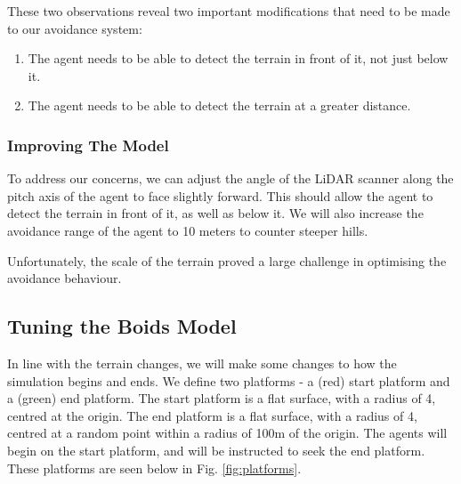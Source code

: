 \documentclass{article}
\begin{document}
These two observations reveal two important modifications that need to be made to our avoidance system:
\begin{enumerate}
    \item The agent needs to be able to detect the terrain in front of it, not just below it.
    \item The agent needs to be able to detect the terrain at a greater distance.
\end{enumerate}

\subsubsection{Improving The Model}
\label{sec:improving-the-model}
To address our concerns, we can adjust the angle of the LiDAR scanner along the pitch axis of the agent to face slightly forward. This should allow the agent to detect the terrain in front of it, as well as below it. We will also increase the avoidance range of the agent to 10 meters to counter steeper hills. 

Unfortunately, the scale of the terrain proved a large challenge in optimising the avoidance behaviour.

\subsection{Tuning the Boids Model}
In line with the terrain changes, we will make some changes to how the simulation begins and ends. We define two platforms - a (red) start platform and a (green) end platform. The start platform is a flat surface, with a radius of 4, centred at the origin. The end platform is a flat surface, with a radius of 4, centred at a random point within a radius of 100m of the origin. The agents will begin on the start platform, and will be instructed to seek the end platform. These platforms are seen below in Fig. \ref{fig:platforms}.
\end{document}

